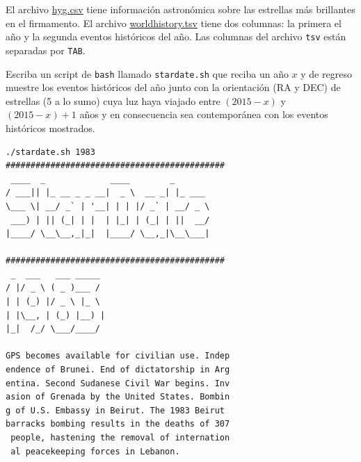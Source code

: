 \documentclass[11pt,letterpaper]{exam}
\begin{document}
\begin{questions}

\newpage


El archivo \href{https://raw.githubusercontent.com/ComputoCienciasUniandes/MetodosComputacionales/master/homework/2015-V/HW1/hyg.csv}{hyg.csv} tiene información astronómica sobre las estrellas más brillantes en el firmamento. El archivo \href{https://raw.githubusercontent.com/ComputoCienciasUniandes/MetodosComputacionales/master/homework/2015-V/HW1/worldhistory.tsv}{worldhistory.tsv} tiene dos columnas: la primera el año y la segunda eventos históricos del año. Las columnas del archivo \verb+tsv+ están separadas por \verb+TAB+.

Escriba un script de \verb+bash+ llamado \verb+stardate.sh+ que reciba un año $x$ y de regreso muestre los eventos históricos del año junto con la orientación (RA y DEC) de estrellas (5 a lo sumo) cuya luz haya viajado entre $(2015-x)$ y $(2015-x)+1$ años y en consecuencia sea contemporánea con los eventos históricos mostrados.

\begin{verbatim}
./stardate.sh 1983
############################################
 ____  _             ____        _       
/ ___|| |_ __ _ _ __|  _ \  __ _| |_ ___ 
\___ \| __/ _` | '__| | | |/ _` | __/ _ \
 ___) | || (_| | |  | |_| | (_| | ||  __/
|____/ \__\__,_|_|  |____/ \__,_|\__\___|
                                         
############################################
 _  ___   ___ _____ 
/ |/ _ \ ( _ )___ / 
| | (_) |/ _ \ |_ \ 
| |\__, | (_) |__) |
|_|  /_/ \___/____/ 
                    
GPS becomes available for civilian use. Indep
endence of Brunei. End of dictatorship in Arg
entina. Second Sudanese Civil War begins. Inv
asion of Grenada by the United States. Bombin
g of U.S. Embassy in Beirut. The 1983 Beirut 
barracks bombing results in the deaths of 307
 people, hastening the removal of internation
 al peacekeeping forces in Lebanon.


\end{verbatim}
\end{questions}
\end{document}
